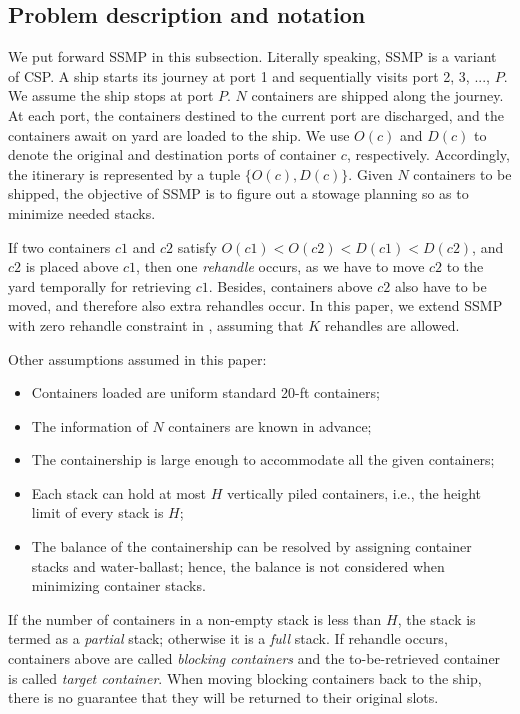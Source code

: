 \documentclass[review,3p,times,authoryear,12pt]{elsarticle}
\begin{document}
\subsection{Problem description and notation}
We put forward SSMP in this subsection.
Literally speaking, SSMP is a variant of CSP.
A ship starts its journey at port 1 and sequentially visits port 2, 3, ..., $P$. We assume the ship stops at port $P$.
$N$ containers are shipped along the journey.
At each port, the containers destined to the current port are discharged, and the containers await on yard are loaded to the ship.
We use $O(c)$ and $D(c)$ to denote the original and destination ports of container $c$, respectively. Accordingly, the itinerary is represented by a tuple $\{O(c), D(c)\}$.
Given $N$ containers to be shipped, the objective of SSMP is to figure out a stowage planning so as to minimize needed stacks.

If two containers $c1$ and $c2$ satisfy $O(c1)<O(c2)<D(c1)<D(c2)$, and $c2$ is placed above $c1$, then one \textit{rehandle} occurs, as we have to move $c2$ to the yard temporally for retrieving $c1$. Besides, containers above $c2$ also have to be moved, and therefore also extra rehandles occur.
In this paper, we extend SSMP with zero rehandle constraint in \cite{wang2014stowage}, assuming that $K$ rehandles are allowed.

Other assumptions assumed in this paper:
\begin{itemize}
\item Containers loaded are uniform standard 20-ft containers;
\item The information of $N$ containers are known in advance;
\item The containership is large enough to accommodate all the given containers;
\item Each stack can hold at most $H$ vertically piled containers, i.e., the height limit of every stack is $H$;
\item The balance of the containership can be resolved by assigning container stacks and water-ballast; hence, the balance is not considered when minimizing container stacks.
\end{itemize}

If the number of containers in a non-empty stack is less than $H$, the stack is termed as a \textit{partial} stack; otherwise it is a \textit{full} stack.
If rehandle occurs, containers above are called \textit{blocking containers} and the to-be-retrieved container is called \textit{target container}.
When moving blocking containers back to the ship, there is no guarantee that they will be returned to their original slots.
\end{document}
